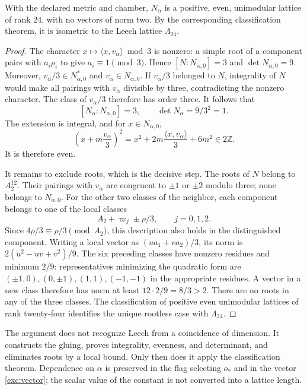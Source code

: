 \begin{theorem}
\label{exc:teorema-leech}
With the declared metric and chamber, $N_\alpha$ is a positive,
even, unimodular lattice of rank $24$, with no vectors of norm two.
By the corresponding classification theorem, it is isometric to the
Leech lattice $\Lambda_{24}$.
\end{theorem}

\begin{proof}
The character $x\mapsto\langle x,v_\alpha\rangle\bmod3$ is nonzero:
a simple root of a component pairs with $a_i\rho_i$ to give
$a_i\equiv1\pmod3$. Hence $[N:N_{\alpha,0}]=3$ and
$\det N_{\alpha,0}=9$. Moreover,
$v_\alpha/3\in N_{\alpha,0}^*$ and $v_\alpha\in N_{\alpha,0}$.
If $v_\alpha/3$ belonged to $N$, integrality of $N$ would make
all pairings with $v_\alpha$ divisible by three,
contradicting the nonzero character. The class of $v_\alpha/3$ therefore
has order three. It follows that
\[
 [N_\alpha:N_{\alpha,0}]=3,
 \qquad \det N_\alpha=9/3^2=1.
\]
The extension is integral, and for $x\in N_{\alpha,0}$,
\[
 \left(x+m\frac{v_\alpha}{3}\right)^2
   =x^2+2m\frac{\langle x,v_\alpha\rangle}{3}+6m^2
   \in2\mathbb Z.
\]
It is therefore even.

It remains to exclude roots, which is the decisive step. The roots of $N$
belong to $A_2^{12}$. Their pairings with $v_\alpha$ are
congruent to $\pm1$ or $\pm2$ modulo three; none belongs to
$N_{\alpha,0}$. For the other two classes of the neighbor, each component
belongs to one of the local classes
\[
 A_2+\varpi_j\pm\rho/3,\qquad j=0,1,2.
\]
Since $4\rho/3\equiv\rho/3\pmod{A_2}$, this description also
holds in the distinguished component. Writing a local vector
as $(u a_1+v a_2)/3$, its norm is
$2(u^2-uv+v^2)/9$. The six preceding classes have nonzero
residues and minimum $2/9$: representatives minimizing the quadratic form
are $(\pm1,0),(0,\pm1),(1,1),(-1,-1)$ in the appropriate residues.
A vector in a new class therefore has norm at least
$12\cdot2/9=8/3>2$. There are no roots in any of the three classes.
The classification of positive even unimodular lattices of
rank twenty-four identifies the unique rootless case with
$\Lambda_{24}$.
\end{proof}

The argument does not recognize Leech from a coincidence of dimension.
It constructs the gluing, proves integrality, evenness, and determinant, and
eliminates roots by a local bound. Only then does it apply the
classification theorem. Dependence on $\alpha$ is preserved in
the flag selecting $o_*$ and in the vector \eqref{exc:vector};
the scalar value of the constant is not converted into a lattice
length.


